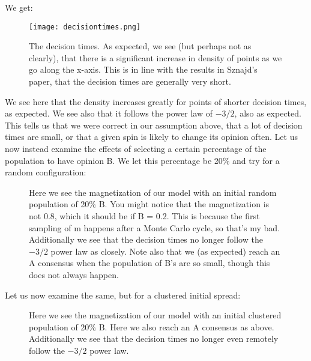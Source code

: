 \documentclass{article}
\begin{document}
We get:
\begin{figure}[ht!]
    \centering
    \texttt{[image: decisiontimes.png]}
    \caption{The decision times. \newline
    As expected, we see (but perhaps not as clearly), that there is a significant increase in density of points as we go along the x-axis. This is in line with the results in Sznajd's paper, that the decision times are generally very short.}
    \label{fig4}
\end{figure} \newpage
We see here that the density increases greatly for points of shorter decision times, as expected. We see also that it follows the power law of $-3/2$, also as expected. This tells us that we were correct in our assumption above, that a lot of decision times are small, or that a given spin is likely to change its opinion often.
\newline
Let us now instead examine the effects of selecting a certain percentage of the population to have opinion B. We let this percentage be 20\% and try for a random configuration:
\begin{figure}[ht!] 
\centering
{}
\caption{Here we see the magnetization of our model with an initial random population of 20\% B. \newline
You might notice that the magnetization is not 0.8, which it should be if B = 0.2. This is because the first sampling of m happens after a Monte Carlo cycle, so that's my bad. \newline
Additionally we see that the decision times no longer follow the $-3/2$ power law as closely. \newline
Note also that we (as expected) reach an A consensus when the population of B's are so small, though this does not always happen.}
\end{figure} \newline
Let us now examine the same, but for a clustered initial spread:
\begin{figure}[ht!] 
\centering
{}
\caption{Here we see the magnetization of our model with an initial clustered population of 20\% B. \newline
Here we also reach an A consensus as above.\newline
Additionally we see that the decision times no longer even remotely follow the $-3/2$ power law.}
\end{figure} \newline
\end{document}
